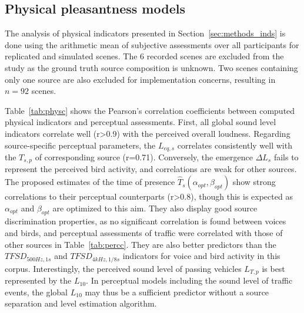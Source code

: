 \documentclass[11pt,a4paper]{article}
\begin{document}
\subsection{Physical pleasantness models}
\label{sec:results_phys}

The analysis of physical indicators presented in Section~\ref{sec:methods_inds} is done using the arithmetic mean of subjective assessments over all participants for replicated and simulated scenes. The 6 recorded scenes are excluded from the study as the ground truth source composition is unknown. Two scenes containing only one source are also excluded for implementation concerns, resulting in $n=92$ scenes.

Table~\ref{tab:physc} shows the Pearson's correlation coefficients between computed physical indicators and perceptual assessments. First, all global sound level indicators correlate well (r>0.9) with the perceived overall loudness. Regarding source-specific perceptual parameters, the $L_{eq, s}$ correlates consistently well with the $T_{s, p}$ of corresponding source (r=0.71). Conversely, the emergence $\Delta L_s$ fails to represent the perceived bird activity, and correlations are weak for other sources. The proposed estimates of the time of presence $\hat T_s(\alpha_{opt}, \beta_{opt})$ show strong correlations to their perceptual counterparts (r>0.8), though this is expected as $\alpha_{opt}$ and $\beta_{opt}$ are optimized to this aim. They also display good source discrimination properties, as no significant correlation is found between voices and birds, and perceptual assessments of traffic were correlated with those of other sources in Table~\ref{tab:percc}. They are also better predictors than the $TFSD_{500Hz, 1s}$ and $TFSD_{4kHz, 1/8s}$ indicators for voice and bird activity in this corpus. Interestingly, the perceived sound level of passing vehicles $L_{T, p}$ is best represented by the $L_{10}$. In perceptual models including the sound level of traffic events, the global $L_{10}$ may thus be a sufficient predictor without a source separation and level estimation algorithm.
\end{document}
